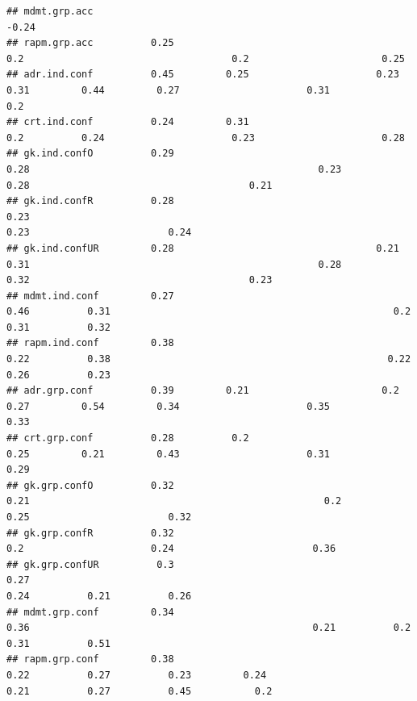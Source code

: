 \documentclass[]{article}
\begin{document}
\begin{verbatim}
## mdmt.grp.acc                                                              -0.24                                                                                                                          
## rapm.grp.acc          0.25                                                                              0.2                                    0.2                       0.25                            
## adr.ind.conf          0.45         0.25                      0.23                                      0.31         0.44         0.27                      0.31                         0.2              
## crt.ind.conf          0.24         0.31                                                   0.2          0.24                      0.23                      0.28                                          
## gk.ind.confO          0.29                                                 0.28                                                  0.23                      0.28                                      0.21
## gk.ind.confR          0.28                                                 0.23                                                                            0.23                        0.24              
## gk.ind.confUR         0.28                                   0.21          0.31                                                  0.28                      0.32                                      0.23
## mdmt.ind.conf         0.27                                                               0.46          0.31                                                 0.2          0.31          0.32              
## rapm.ind.conf         0.38                                                               0.22          0.38                                                0.22          0.26          0.23              
## adr.grp.conf          0.39         0.21                       0.2                                      0.27         0.54         0.34                      0.35                        0.33              
## crt.grp.conf          0.28          0.2                                                                0.25         0.21         0.43                      0.31                        0.29              
## gk.grp.confO          0.32                                                 0.21                                                   0.2                      0.25                        0.32              
## gk.grp.confR          0.32                                                                                                        0.2                      0.24                        0.36              
## gk.grp.confUR          0.3                                                 0.27                                                                            0.24          0.21          0.26              
## mdmt.grp.conf         0.34                                                               0.36                                                 0.21          0.2          0.31          0.51              
## rapm.grp.conf         0.38                                                 0.22          0.27          0.23         0.24                                   0.21          0.27          0.45           0.2
\end{verbatim}
\end{document}

